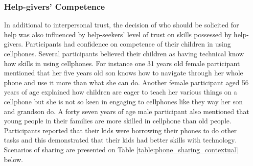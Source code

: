 \subsubsection*{Help-givers' Competence}
In additional to interpersonal trust, the decision of who should be solicited for help was also influenced by help-seekers' level of trust on skills possessed by help-givers. Participants had confidence on competence of their children in using cellphones. Several participants believed their children as having technical know how skills in using cellphones. For instance one 31 years old female participant mentioned that her five years old son knows how to navigate through her whole phone and use it more than what she can do. Another female participant aged 56 years of age explained how children are eager to teach her various things on a cellphone but she is not so keen in engaging to cellphones like they way her son and grandson do. A forty seven years of age male participant also mentioned that young people in their families are more skilled in cellphone than old people.
Participants reported that their kids were borrowing their phones to do other tasks and this demonstrated that their kids had better skills with technology. Scenarios of sharing are presented on Table \ref{table:phone_sharing_contextual} below. 

